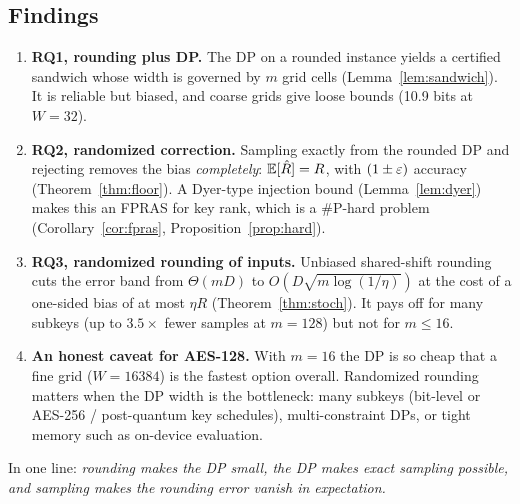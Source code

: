 \begin{table}[h]\centering\small
{}
\caption{Stochastic rounding wins once $\sqrt{m\ln(1/\eta)/2}<m/2$, here at about $m\ge16$, as Lemma~\ref{lem:stoch} predicts.}\label{tab:scaling}
\end{table}

\subsection{Findings}
\begin{enumerate}[leftmargin=*]
\item \textbf{RQ1, rounding plus DP.} The DP on a rounded instance yields a certified sandwich whose width is
      governed by $m$ grid cells (Lemma~\ref{lem:sandwich}). It is reliable but biased, and coarse grids give loose bounds
      (10.9 bits at $W=32$).
\item \textbf{RQ2, randomized correction.} Sampling exactly from the rounded DP and rejecting removes the bias
      \emph{completely}: $\mathbb{E}[\hat R]=R$, with $(1\pm\varepsilon)$ accuracy (Theorem~\ref{thm:floor}). A Dyer-type injection bound
      (Lemma~\ref{lem:dyer}) makes this an FPRAS for key rank, which is a \#P-hard problem (Corollary~\ref{cor:fpras}, Proposition~\ref{prop:hard}).
\item \textbf{RQ3, randomized rounding of inputs.} Unbiased shared-shift rounding cuts the error band from $\Theta(mD)$ to
      $O(D\sqrt{m\log(1/\eta)})$ at the cost of a one-sided bias of at most $\eta R$ (Theorem~\ref{thm:stoch}). It pays off for
      many subkeys (up to $3.5\times$ fewer samples at $m=128$) but not for $m\le16$.
\item \textbf{An honest caveat for AES-128.} With $m=16$ the DP is so cheap that a fine grid ($W=16384$) is the fastest
      option overall. Randomized rounding matters when the DP width is the bottleneck: many subkeys (bit-level or
      AES-256 / post-quantum key schedules), multi-constraint DPs, or tight memory such as on-device evaluation.
\end{enumerate}

\noindent In one line: \emph{rounding makes the DP small, the DP makes exact sampling possible, and
sampling makes the rounding error vanish in expectation.}
